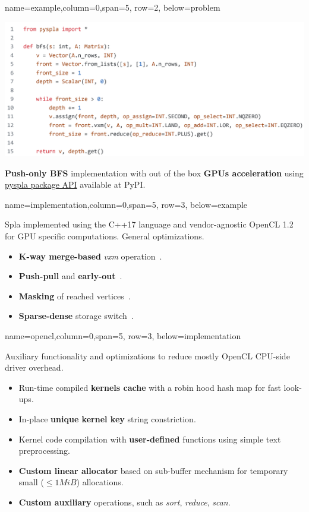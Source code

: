 \documentclass[a0paper,portrait]{baposter}
\begin{document}
\begin{poster}
{name=example,column=0,span=5, row=2, below=problem}
{
\begin{minipage}[b]{1.0\textwidth}
    \vspace{0pt}
    \includegraphics[width=\textwidth]{figures/spla_bfs.png}
\end{minipage}
\begin{minipage}[t]{1.0\textwidth}
    \textbf{Push-only BFS} implementation with out of the box \textbf{GPUs acceleration} using \href{pypi.org/project/pyspla/}{pyspla package API} available at PyPI.
\end{minipage}
}

{name=implementation,column=0,span=5, row=3, below=example}
{
Spla implemented using the C++17 language and vendor-agnostic OpenCL 1.2 for GPU specific computations. General optimizations.

\begin{itemize}
    \item \textbf{K-way merge-based} \textit{vxm} operation~\cite{7284398:spvspm}.
    \item \textbf{Push-pull} and \textbf{early-out}~\cite{https://doi.org/10.48550/arxiv.1804.03327:pushpull}.
    \item \textbf{Masking} of reached vertices~\cite{yang2019graphblast}.
    \item \textbf{Sparse-dense} storage switch~\cite{yang2019graphblast}.
\end{itemize}
}

{name=opencl,column=0,span=5, row=3, below=implementation}
{
Auxiliary functionality and optimizations to reduce mostly OpenCL CPU-side driver overhead.
\begin{itemize}
    \item Run-time compiled \textbf{kernels cache} with a robin hood hash map for fast look-ups.
    \item In-place \textbf{unique kernel key} string constriction. 
    \item Kernel code compilation with \textbf{user-defined} functions using simple text preprocessing.
    \item \textbf{Custom linear allocator} based on sub-buffer mechanism for temporary small ($\leq1\textit{MiB}$) allocations.
    \item \textbf{Custom auxiliary} operations, such as \textit{sort}, \textit{reduce}, \textit{scan}.
\end{itemize}
}


\end{poster}
\end{document}
